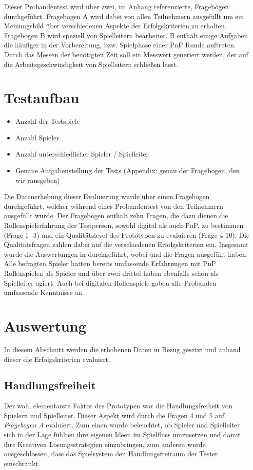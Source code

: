 Dieser Probandentest wird über zwei, im \hyperref[sec:frageboegen]{Anhang referenzierte}, Fragebögen durchgeführt. Fragebogen A wird dabei von allen Teilnehmern ausgefüllt um ein Meinungsbild über verschiedenen Aspekte der Erfolgskriterien zu erhalten. Fragebogen B wird speziell von Spielleitern bearbeitet. B enthält einige Aufgaben die häufiger in der Vorbereitung, bzw. Spielphase einer PnP Runde auftreten. Durch das Messen der benötigten Zeit soll ein Messwert generiert werden, der auf die Arbeitsgeschwindigkeit von Spielleitern schließen lässt.
  



\section{Testaufbau}
\label{sec:Testaufbau}
\begin{itemize}
	\item Anzahl der Testspiele
	\item Anzahl Spieler
	\item Anzahl unterschiedlicher Spieler / Spielleiter
	\item Genaue Aufgabenstellung der Tests (Appendix: genau der Fragebogen, den wir rausgeben)
\end{itemize}
Die Datenerhebung dieser Evaluierung wurde über einen Fragebogen durchgeführt, welcher während eines Probandentest von den Teilnehmern ausgefüllt wurde. Der Fragebogen enthält zehn Fragen, die dazu dienen die Rollenspielerfahrung der Testperson, sowohl digital als auch PnP, zu bestimmen (Frage 1 -3) und ein Qualitätslevel des Prototypen zu evaluieren (Frage 4-10). Die Qualitätsfragen zahlen dabei auf die verschiedenen Erfolgskriterien ein. Insgesamt wurde die Auswertungen in  durchgeführt, wobei  und  die Fragen ausgefüllt haben. Alle befragten Spieler hatten bereits umfassende Erfahrungen mit PnP Rollenspielen als Spieler und über zwei drittel haben ebenfalls schon als Spielleiter agiert. Auch bei digitalen Rollenspiele gaben alle Probanden umfassende Kenntnisse an.



\section{Auswertung}
\label{sec:Auswertung}

In diesem Abschnitt werden die erhobenen Daten in Bezug gesetzt und anhand dieser die Erfolgskriterien evaluiert.


\subsection{Handlungsfreiheit}
\label{sec:Handlungsfreiheit}
Der wohl elementarste Faktor des Prototypen war die Handlungsfreiheit von Spielern und Spielleiter. Dieser Aspekt wird durch die Fragen 4 und 5 auf \emph{Fragebogen A} evaluiert. Zum einen wurde beleuchtet, ob Spieler und Spielleiter sich in der Lage fühlten ihre eigenen Ideen im Spielfluss umzusetzen und damit ihre Kreativen Lösungsstrategien einzubringen, zum anderen wurde ausgeschlossen, dass das Spielsystem den Handlungsfreiraum der Tester einschränkt. 		
